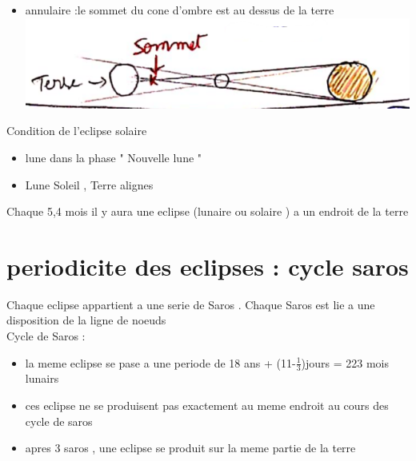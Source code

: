\documentclass[12pt]{book}
\begin{document}
\begin{itemize}
\begin{itemize}
                    \item annulaire :le sommet du cone d'ombre est au dessus de la terre \\
                        \includegraphics[width=0.3\linewidth]{pic/solareclipsannulair.png}
                \end{itemize}
                Condition de l'eclipse solaire \begin{itemize}
                    \item lune dans la phase " Nouvelle lune "
                    \item Lune Soleil , Terre alignes
                \end{itemize}
        \end{itemize}
        Chaque 5,4 mois il y aura une eclipse (lunaire ou solaire ) a un endroit de la terre 
        \section{periodicite des eclipses : cycle saros}
            Chaque eclipse appartient a une serie de Saros . Chaque Saros est lie a une disposition de la ligne de noeuds \\
            Cycle de Saros : \\
                \begin{itemize}
                    \item la meme eclipse se pase a une periode de 18 ans + (11-$ \frac{1}{3} $)jours = 223 mois lunairs 
                    \item ces eclipse ne se produisent pas exactement au meme endroit au cours des cycle de saros 
                    \item apres 3 saros , une eclipse se produit sur la meme partie de la terre
                \end{itemize}
        
        
\end{document}
